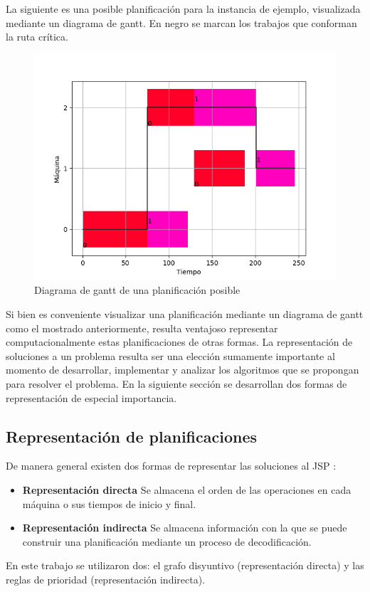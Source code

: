 La siguiente es una posible planificación para la instancia de ejemplo, visualizada mediante un diagrama de gantt. En negro se marcan los trabajos que conforman la ruta crítica. 
\begin{figure}[H]
\centering
\includegraphics[scale=.7]{Imagenes/planejemplorc.png}
\caption{Diagrama de gantt de una planificación posible}
\label{fig:gantt}
\end{figure}

Si bien es conveniente visualizar una planificación mediante un diagrama de gantt como el mostrado anteriormente, resulta ventajoso representar computacionalmente estas planificaciones de otras formas. La representación de soluciones a un problema resulta ser una elección sumamente importante al momento de desarrollar, implementar y analizar los algoritmos que se propongan para resolver el problema\cite{rothlauf2002representations}. En la siguiente sección se desarrollan dos formas de representación de especial importancia.

\subsection{Representación de planificaciones}
De manera general existen dos formas de representar las soluciones al JSP \cite{Cheng1996}:
\begin{itemize}
    \item \textbf{Representación directa} Se almacena el orden de las operaciones en cada máquina o sus tiempos de inicio y final.
    \item \textbf{Representación indirecta} Se almacena información con la que se puede construir una planificación mediante un proceso de decodificación.
\end{itemize}
En este trabajo se utilizaron dos: el grafo disyuntivo (representación directa) y las reglas de prioridad (representación indirecta).
